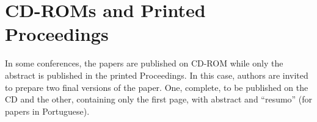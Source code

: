     \section{CD-ROMs and Printed Proceedings}

    In some conferences, the papers are published on CD-ROM while only the
    abstract is published in the printed Proceedings. In this case, authors are
    invited to prepare two final versions of the paper. One, complete, to be
    published on the CD and the other, containing only the first page, with
    abstract and ``resumo'' (for papers in Portuguese).
